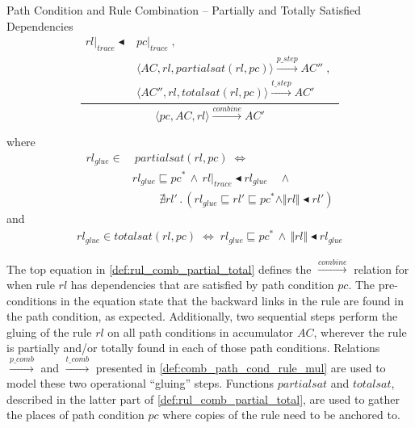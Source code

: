 \begin{definition}{Path Condition and Rule Combination -- Partially and Totally Satisfied Dependencies\\}
$$\frac{\begin{array}{ll}rl|_{trace}\blacktriangleleft &pc|_{trace}\;,\\&\langle AC,rl,partialsat(rl,pc)\rangle\xrightarrow{p\_step} AC''\;,\;\\&\langle AC'',rl,totalsat(rl,pc)\rangle \xrightarrow{t\_step} AC'
\end{array}} 
{\langle pc,AC,rl\rangle \xrightarrow{combine} AC'}$$
\begin{center}
\vspace{.3cm}
where
\begin{align*}
rl_{glue}\in&~partialsat(rl,pc) \;\Longleftrightarrow\; \\
&rl_{glue}\sqsubseteq pc^{*} \,\land\, rl|_{trace}\blacktriangleleft rl_{glue}\quad\land\, \\&\hspace{1cm}\nexists rl' \,.\, (rl_{glue}\sqsubseteq rl'\sqsubseteq pc^{*} \land \Vert rl\Vert \blacktriangleleft rl')
\end{align*}
and 
\begin{align*}
rl_{glue}\in totalsat(rl,pc) \;\Longleftrightarrow \;rl_{glue}\sqsubseteq pc^{*} \,\land\, \Vert rl\Vert\blacktriangleleft rl_{glue}
\end{align*}
\end{center}


\end{definition}



The top equation in \cref{def:rul_comb_partial_total} defines the $\stackrel{combine}{\rightarrow}$ relation for when rule $rl$ has dependencies that are satisfied by path condition $pc$. The pre-conditions in the equation state that the backward links in the rule are found in the path condition, as expected. Additionally, two sequential steps perform the gluing of the rule $rl$ on all path conditions in accumulator $AC$, wherever the rule is partially and/or totally found in each of those path conditions. Relations $\stackrel{p\_comb}{\rightarrow}$ and $\stackrel{t\_comb}{\rightarrow}$ presented in \cref{def:comb_path_cond_rule_mul} are used to model these two operational ``gluing'' steps. Functions $partialsat$ and $totalsat$, described in the latter part of \cref{def:rul_comb_partial_total}, are used to gather the places of path condition $pc$ where copies of the rule need to be anchored to.


